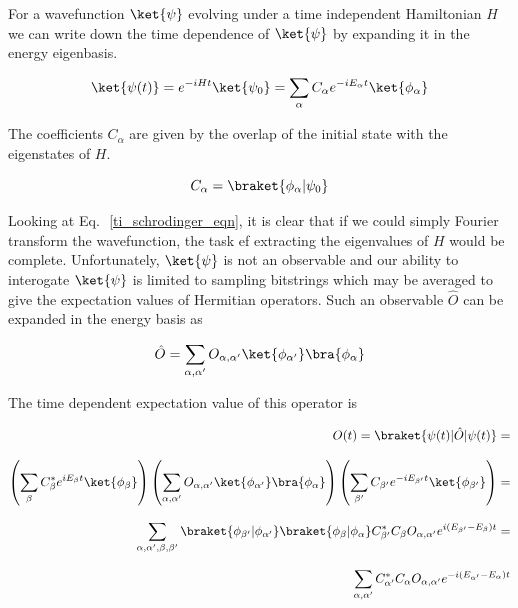 For a wavefunction $\ket{\psi}$ evolving under a time independent Hamiltonian $H$ we can write down the time dependence of $\ket{\psi}$ by expanding it in the
energy eigenbasis.

\begin{equation}
    \ket{\psi (t)} =e^{-i H t} \ket{\psi_{0}} = \sum_{\alpha} C_{\alpha} e^{-i E_{\alpha} t} \ket{\phi_{\alpha}}
    \label{ti_schrodinger_eqn}
\end{equation}

\noindent The coefficients $C_{\alpha}$ are given by the overlap of the initial state with the eigenstates of $H$.

\begin{equation}
    C_{\alpha} = \braket{\phi_{\alpha}|\psi_{0}}
\end{equation}

\noindent Looking at Eq.\,~\ref{ti_schrodinger_eqn}, it is clear that if we could simply Fourier transform the wavefunction, the task ef extracting the eigenvalues of $H$ would be complete.
Unfortunately, $\ket{\psi}$ is not an observable and our ability to interogate $\ket{\psi}$ is limited to sampling bitstrings which may be averaged
to give the expectation values of Hermitian operators.  Such an observable $\hat{O}$ can be expanded in the energy basis as

\begin{equation}
    \label{observable}
    \hat{O} = \sum_{\alpha,\alpha^{\prime}} O_{\alpha,\alpha^{\prime}} \ket{\phi_{\alpha^{\prime}}} \bra{\phi_{\alpha}}
\end{equation}

\noindent The time dependent expectation value of this operator is

\begin{equation*}
    \label{derive_energy_differences}
    \begin{aligned}
        O(t) =\braket{\psi(t)|\hat{O}|\psi(t)} = \\[2.0ex]
        \left( \sum_{\beta} C^{*}_{\beta} e^{i E_{\beta} t} \ket{\phi_{\beta}} \right)
        \left( \sum_{\alpha,\alpha^{\prime}} O_{\alpha,\alpha^{\prime}} \ket{\phi_{\alpha^{\prime}}} \bra{\phi_{\alpha}} \right)
        \left( \sum_{\beta^{\prime}} C_{\beta^{\prime}} e^{- i E_{\beta^{\prime}} t} \ket{\phi_{\beta^{\prime}}} \right) = \\[2.0ex]
        \sum_{\alpha, \alpha^{\prime}, \beta, \beta^{\prime} }
        \braket{\phi_{\beta^{\prime}}|\phi_{\alpha^{\prime}}}
        \braket{\phi_{\beta}|\phi_{\alpha}}
        C_{\beta^{\prime}}^{*} C_{\beta} O_{\alpha, \alpha^{\prime}} e^{i (E_{\beta^\prime} - E_{\beta}) t} = \\[2.0ex]
        \sum_{\alpha, \alpha^{\prime}} C^{*}_{\alpha^{\prime}} C_{\alpha} O_{\alpha, \alpha^{\prime}} e^{- i (E_{\alpha^{\prime}} - E_{\alpha}) t}
    \end{aligned}
\end{equation*}

